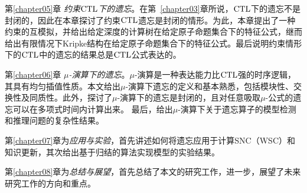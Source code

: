 第\ref{chapter05}章 {\em 约束$\textrm{CTL}$下的遗忘}。在第~\ref{chapter03}章所说，$\textrm{CTL}$下的遗忘不是封闭的，因此在本章探讨了约束$\textrm{CTL}$遗忘是封闭的情形。为此，本章提出了一种约束的互模拟，并给出给定深度的计算树在给定原子命题集合下的特征公式，继而给出有限情况下Kripke结构在给定原子命题集合下的特征公式。最后说明约束情形下的$\textrm{CTL}$中的遗忘的结果总是$\textrm{CTL}$公式表达的。




第\ref{chapter06}章 {\em $\mu$-演算下的遗忘}。$\mu$-演算是一种表达能力比$\textrm{CTL}$强的时序逻辑，其具有均匀插值性质。本文给出$\mu$-演算下遗忘的定义和基本熟悉，包括模块性、交换性及同质性。此外，探讨了$\mu$-演算下的遗忘是封闭的，且对任意吸取$\mu$-公式的遗忘可以在多项式时间内计算出来。
最后，给出$\mu$-演算下关于遗忘算子的模型检测和推理问题的复杂性结果。



第\ref{chapter07}章为\textit{应用与实验}，首先讲述如何将遗忘应用于计算SNC（WSC）和知识更新，其次给出基于归结的算法实现模型的实验结果。


第\ref{chapter08}章为\textit{总结与展望}，首先总结了本文的研究工作，进一步，展望了未来研究工作的方向和重点。
